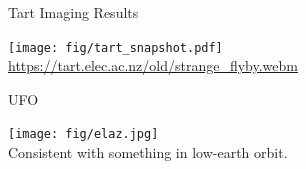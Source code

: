 \documentclass[ignorenonframetext]{beamer}
\begin{document}
% 
% 
% 


\begin{frame}{Tart Imaging Results}
\begin{center}
\texttt{[image: fig/tart\_snapshot.pdf]}\\
 \url{https://tart.elec.ac.nz/old/strange_flyby.webm}
 \end{center}
\end{frame}

\begin{frame}{UFO}
\begin{center}
\texttt{[image: fig/elaz.jpg]}\\
 Consistent with something in low-earth orbit.
 \end{center}
\end{frame}
\end{document}
